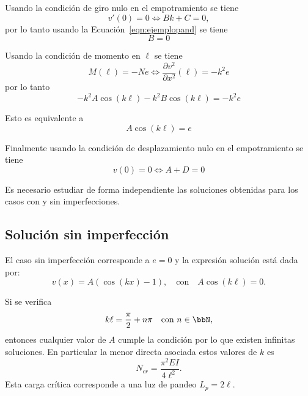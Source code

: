 Usando la condición de giro nulo en el empotramiento se tiene
\begin{equation}
v'(0)=0 \Leftrightarrow  Bk + C = 0,
\end{equation}
%
por lo tanto usando la Ecuación~\eqref{eqn:ejemplopand} se tiene
\begin{equation}
\boxed{
B=0
}
\end{equation}

Usando la condición de momento en $\ell$ se tiene
%
\begin{equation}
M(\ell) = -N e \Leftrightarrow \frac{\partial v^2}{\partial x^2} (\ell)  = - k^2 e
\end{equation}
%
por lo tanto
%
\begin{equation}
-k^2 A \cos(k\ell) - k^2 B \cos(k\ell) = -k^2 e
\end{equation}

Esto es equivalente a 
\begin{equation}\label{eqn:acos}
\boxed{
A \cos(k\ell)  = e
}
\end{equation}

Finalmente usando la condición de desplazamiento nulo en el empotramiento se tiene
%
\begin{equation}
v(0)=0  \Leftrightarrow \boxed{ A + D = 0}
\end{equation}

Es necesario estudiar de forma independiente las soluciones obtenidas para los casos con y sin imperfecciones.

\subsection{Solución sin imperfección}

El caso sin imperfección corresponde a $e=0$ y la expresión solución está dada por:
%
\begin{equation}
v(x) = A (\cos(k x) -1), \quad \text{con} \quad A\cos(k\ell) = 0.
\end{equation}

Si se verifica
%
\begin{equation}
k \ell = \frac{\pi}{2} + n\pi  \quad \text{con} \,\, n\in \bbN,
\end{equation}
%
entonces cualquier valor de $A$ cumple la condición por lo que existen infinitas soluciones. %
%
En particular la menor directa asociada estos valores de $k$ es
\begin{equation}
\boxed{
N_{cr} = \frac{\pi^2 E I}{4 \ell^2}.
}
\end{equation}
%
Esta carga crítica corresponde a una luz de pandeo $L_p = 2\ell$.




